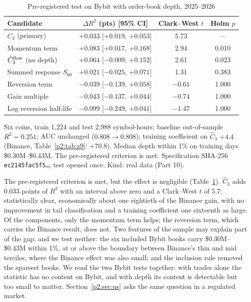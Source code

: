 \begin{table}[t]\centering\small
\begin{threeparttable}
\caption{Pre-registered test on Bybit with order-book depth, 2025--2026}\label{p2:tab:bybitob}
\setlength{\tabcolsep}{3pt}
\begin{tabular}{lccc}
\toprule
Candidate & $\Delta R^2$ (pts) [95\% CI] & Clark--West $t$ & Holm $p$\\
\midrule
$\hat C_3$ (primary) & $+0.033$ [$+0.019$, $+0.053$] & 5.73 & ---\\
Momentum term & $+0.083$ [$+0.017$, $+0.168$] & 2.94 & 0.010\\
$\hat C_3^{\rm flow}$ (no depth) & $+0.064$ [$-0.009$, $+0.152$] & 2.61 & 0.023\\
Summed response $S_{60}$ & $+0.021$ [$-0.025$, $+0.071$] & 1.31 & 0.383\\
Reversion term & $-0.039$ [$-0.139$, $+0.058$] & $-0.61$ & 1.000\\
Gain multiple & $-0.043$ [$-0.137$, $+0.044$] & $-0.74$ & 1.000\\
Log reversion half-life & $-0.099$ [$-0.249$, $+0.041$] & $-1.47$ & 1.000\\
\bottomrule
\end{tabular}
\begin{tablenotes}\footnotesize\item Six coins, train 1{,}224 and test 2{,}988 symbol-hours; baseline out-of-sample $R^2=0.251$; AUC unchanged ($0.808\to0.808$); training coefficient on $\hat C_3$ $+4.4$ (Binance, Table~\ref{p2:tab:z9}: $+70.8$). Median depth within 1\% on training days \$0.30M--\$0.43M. The pre-registered criterion is met. Specification SHA-256 \texttt{ec2145fac5f5\ldots}; test opened once. Kind: real data (Part 10).\end{tablenotes}
\end{threeparttable}
\end{table}

The pre-registered criterion is met, but the effect is negligible (Table~\ref{p2:tab:bybitob}). $\hat C_3$ adds $0.033$ points of $R^2$ with an interval above zero and a Clark--West $t$ of $5.7$: statistically clear, economically about one eightieth of the Binance gain, with no improvement in tail classification and a training coefficient one sixteenth as large. Of the components, only the momentum term helps; the reversion term, which carries the Binance result, does not. Two features of the sample may explain part of the gap, and we test neither: the six included Bybit books carry \$0.30M--\$0.43M within 1\%, at or above the boundary between Binance's thin and mid terciles, where the Binance effect was also small; and the inclusion rule removed the sparsest books. We read the two Bybit tests together: with trades alone the statistic has no content on Bybit, and with depth its content is detectable but too small to matter. Section~\ref{p2:sec:us} asks the same question in a regulated market.

